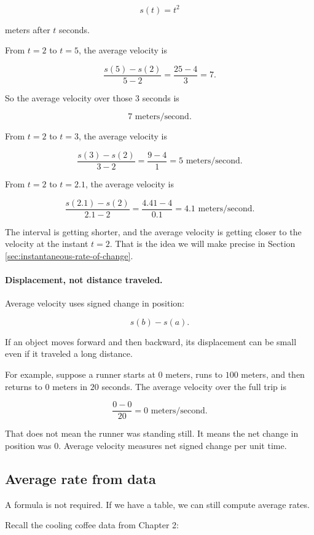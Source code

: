 \[
s(t)=t^2
\]

meters after \(t\) seconds.

From \(t=2\) to \(t=5\), the average velocity is

\[
\frac{s(5)-s(2)}{5-2}
=
\frac{25-4}{3}
=
7.
\]

So the average velocity over those \(3\) seconds is

\[
7\text{ meters/second}.
\]

From \(t=2\) to \(t=3\), the average velocity is

\[
\frac{s(3)-s(2)}{3-2}
=
\frac{9-4}{1}
=
5\text{ meters/second}.
\]

From \(t=2\) to \(t=2.1\), the average velocity is

\[
\frac{s(2.1)-s(2)}{2.1-2}
=
\frac{4.41-4}{0.1}
=
4.1\text{ meters/second}.
\]

The interval is getting shorter, and the average velocity is getting closer to the velocity at the instant \(t=2\).  That is the idea we will make precise in Section \ref{sec:instantaneous-rate-of-change}.

\paragraph{Displacement, not distance traveled.}
Average velocity uses signed change in position:

\[
s(b)-s(a).
\]

If an object moves forward and then backward, its displacement can be small even if it traveled a long distance.

For example, suppose a runner starts at \(0\) meters, runs to \(100\) meters, and then returns to \(0\) meters in \(20\) seconds.  The average velocity over the full trip is

\[
\frac{0-0}{20}=0\text{ meters/second}.
\]

That does not mean the runner was standing still.  It means the net change in position was \(0\).  Average velocity measures net signed change per unit time.

\subsection{Average rate from data}
\label{subsec:average-rate-from-data}

A formula is not required.  If we have a table, we can still compute average rates.

Recall the cooling coffee data from Chapter 2:

